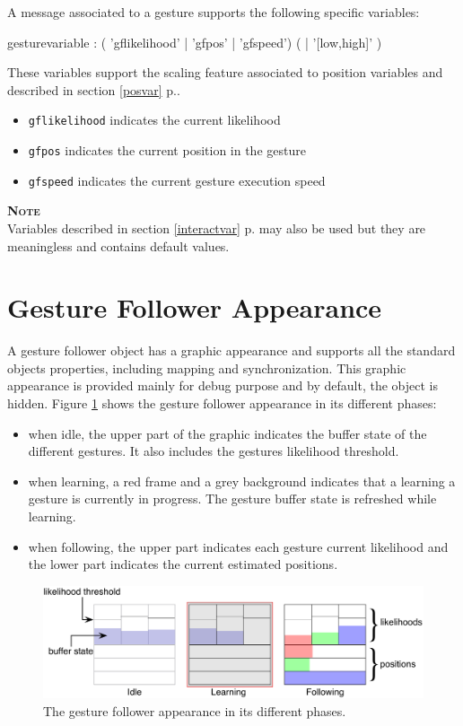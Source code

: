 \documentclass[a4paper,twoside]{report}
\newcommand{\sublevel}[1]	{\section{#1}}
\newcommand{\fullref}[1]	{\ref{#1} p.\pageref{#1}}
\newcommand{\OSC}[1]		{\texttt{#1}}
\newcommand{\note}	[1]		{\vspace{2mm}\textbf{\hspace{-1.03cm}\textbf{\textsc{Note #1}}}}
\begin{document}
A message associated to a gesture supports the following specific variables:
\begin{rail}
gesturevariable : 
		( 'gflikelihood'
		| 'gfpos'
		| 'gfspeed') ( | '[low,high]' ) 
\end{rail}
These variables support the scaling feature associated to position variables and described in section \fullref{posvar}.
\begin{itemize}
\item \OSC{gflikelihood} indicates the current likelihood 
\item \OSC{gfpos} indicates the current position in the gesture 
\item \OSC{gfspeed} indicates the current gesture execution speed 
\end{itemize}

\note{}\\
Variables described in section \fullref{interactvar} may also be used but they are meaningless and contains default values.


\sublevel{Gesture Follower Appearance}\label{gfgraphs}

A gesture follower object has a graphic appearance and supports all the standard objects properties, including mapping and synchronization. This graphic appearance is provided mainly for debug purpose and by default, the object is hidden. Figure  \ref{fig:gfgraph} shows the gesture follower appearance in its different phases:
\begin{itemize}
\item when idle, the upper part of the graphic indicates the buffer state of the different gestures. It also includes the gestures likelihood threshold.
\item when learning, a red frame and a grey background indicates that a learning a gesture is currently in progress. The gesture buffer state is refreshed while learning.
\item when following, the upper part indicates each gesture current likelihood and the lower part indicates the current estimated positions.
\end{itemize}


\begin{figure}[h]
	\centering \includegraphics[width=0.95\columnwidth]{imgs/gesture-follower}
 \caption{The gesture follower appearance in its different phases.}
 \label{fig:gfgraph}
\end{figure}
\end{document}

